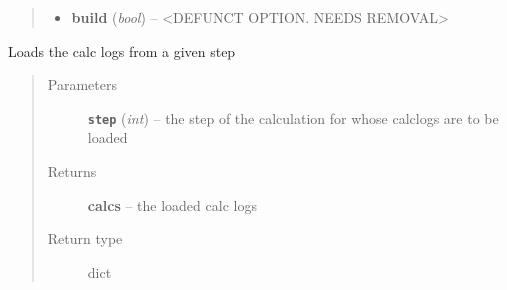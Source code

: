 \documentclass[letterpaper,10pt,english]{sphinxmanual}
\begin{document}
\begin{fulllineitems}
\begin{fulllineitems}
\begin{quote}
\begin{description}
\begin{itemize}
\item {} 
\textbf{build} (\emph{bool}) --
\textless{}DEFUNCT OPTION. NEEDS REMOVAL\textgreater{}

\end{itemize}

\end{description}\end{quote}

\end{fulllineitems}


\begin{fulllineitems}
\label{prep:prep.init.items}
\end{fulllineitems}


\begin{fulllineitems}
\label{prep:prep.init.iteritems}
\end{fulllineitems}


\begin{fulllineitems}
\label{prep:prep.init.keys}
\end{fulllineitems}


\begin{fulllineitems}
\label{prep:prep.init.load}
Loads the calc logs from a given step
\begin{quote}\begin{description}
\item[{Parameters}] \leavevmode
\textbf{\texttt{step}} (\emph{int}) -- the step of the calculation for whose calclogs are to be loaded

\item[{Returns}] \leavevmode
\textbf{calcs} --
the loaded calc logs

\item[{Return type}] \leavevmode
dict

\end{description}\end{quote}

\end{fulllineitems}


\end{fulllineitems}
\end{document}
